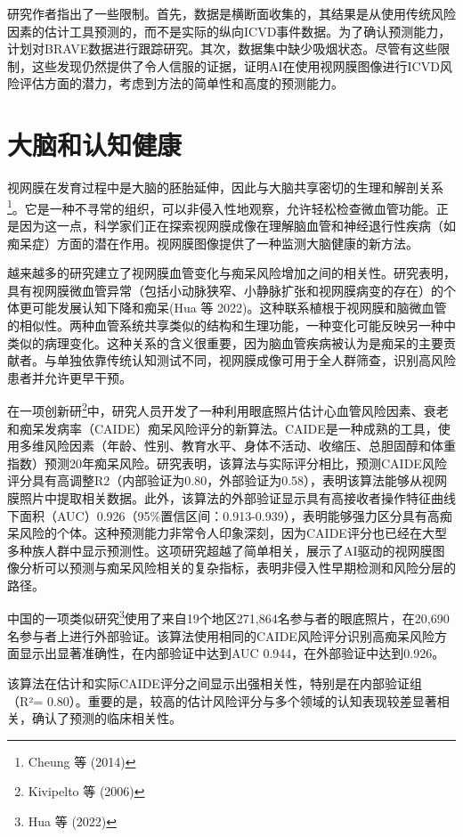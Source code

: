 \documentclass[
  Letterpaper,
]{scrbook}
\begin{document}
研究作者指出了一些限制。首先，数据是横断面收集的，其结果是从使用传统风险因素的估计工具预测的，而不是实际的纵向ICVD事件数据。为了确认预测能力，计划对BRAVE数据进行跟踪研究。其次，数据集中缺少吸烟状态。尽管有这些限制，这些发现仍然提供了令人信服的证据，证明AI在使用视网膜图像进行ICVD风险评估方面的潜力，考虑到方法的简单性和高度的预测能力。

\section{大脑和认知健康}\label{ux5927ux8111ux548cux8ba4ux77e5ux5065ux5eb7}

视网膜在发育过程中是大脑的胚胎延伸，因此与大脑共享密切的生理和解剖关系\footnote{Cheung
  等 (2014)}。它是一种不寻常的组织，可以非侵入性地观察，允许轻松检查微血管功能。正是因为这一点，科学家们正在探索视网膜成像在理解脑血管和神经退行性疾病（如痴呆症）方面的潜在作用。视网膜图像提供了一种监测大脑健康的新方法。

越来越多的研究建立了视网膜血管变化与痴呆风险增加之间的相关性。研究表明，具有视网膜微血管异常（包括小动脉狭窄、小静脉扩张和视网膜病变的存在）的个体更可能发展认知下降和痴呆(Hua
等
2022)。这种联系植根于视网膜和脑微血管的相似性。两种血管系统共享类似的结构和生理功能，一种变化可能反映另一种中类似的病理变化。这种关系的含义很重要，因为脑血管疾病被认为是痴呆的主要贡献者。与单独依靠传统认知测试不同，视网膜成像可用于全人群筛查，识别高风险患者并允许更早干预。

在一项创新研\footnote{Kivipelto 等 (2006)}中，研究人员开发了一种利用眼底照片估计心血管风险因素、衰老和痴呆发病率（CAIDE）痴呆风险评分的新算法。CAIDE是一种成熟的工具，使用多维风险因素（年龄、性别、教育水平、身体不活动、收缩压、总胆固醇和体重指数）预测20年痴呆风险。研究表明，该算法与实际评分相比，预测CAIDE风险评分具有高调整R2（内部验证为0.80，外部验证为0.58），表明该算法能够从视网膜照片中提取相关数据。此外，该算法的外部验证显示具有高接收者操作特征曲线下面积（AUC）0.926（95\%置信区间：0.913-0.939），表明能够强力区分具有高痴呆风险的个体。这种预测能力非常令人印象深刻，因为CAIDE评分也已经在大型多种族人群中显示预测性。这项研究超越了简单相关，展示了AI驱动的视网膜图像分析可以预测与痴呆风险相关的复杂指标，表明非侵入性早期检测和风险分层的路径。

中国的一项类似研究\footnote{Hua 等 (2022)}使用了来自19个地区271,864名参与者的眼底照片，在20,690名参与者上进行外部验证。该算法使用相同的CAIDE风险评分识别高痴呆风险方面显示出显著准确性，在内部验证中达到AUC
0.944，在外部验证中达到0.926。

该算法在估计和实际CAIDE评分之间显示出强相关性，特别是在内部验证组（R²=
0.80）。重要的是，较高的估计风险评分与多个领域的认知表现较差显著相关，确认了预测的临床相关性。
\end{document}
